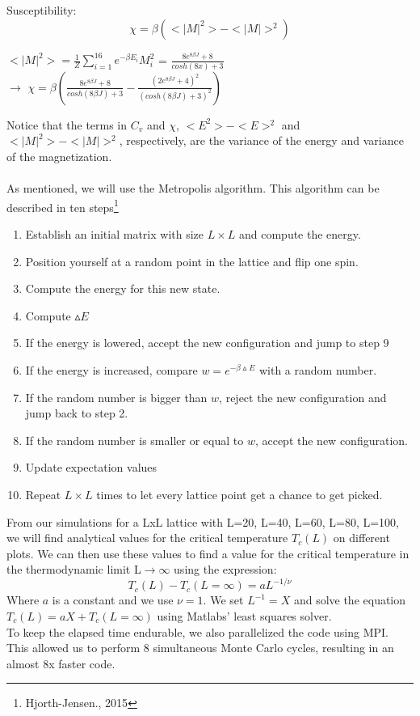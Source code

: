 \documentclass[10pt,a4paper]{article}
\begin{document}
Susceptibility:
$$\chi=\beta(<|M|^2>-<|M|>^2)$$
\begin{center}
$<|M|^2>=\frac{1}{Z}\sum\limits_{i=1}^{16}e^{-\beta E_i}M_i^2$ = $\frac{8e^{8\beta J}+8}{cosh(8x)+3}$\\
$\rightarrow$
$\chi = \beta(\frac{8e^{8\beta J}+8}{cosh(8\beta J)+3}-\frac{(2e^{8\beta J}+4)^2}{(cosh(8\beta J)+3)^2})$\\
\end{center}
\noindent Notice that the terms in $C_v$ and $\chi$, $<E^2>-<E>^2$ and $<|M|^2>-<|M|>^2$, respectively, are the variance of the energy and variance of the magnetization.\\
\\
As mentioned, we will use the Metropolis algorithm. This algorithm can be described in ten steps\footnote{Hjorth-Jensen., 2015}\begin{enumerate}
\item Establish an initial matrix with size $L \times L$ and compute the energy.
\item Position yourself at a random point in the lattice and flip one spin.
\item Compute the energy for this new state.
\item Compute $\vartriangle E$ 
\item If the energy is lowered, accept the new configuration and jump to step 9
\item If the energy is increased, compare $w=e^{-\beta \vartriangle E}$ with a random number.
\item If the random number is bigger than $w$, reject the new configuration and jump back to step 2.
\item If the random number is smaller or equal to $w$, accept the new configuration. 
\item Update expectation values
\item Repeat $L \times L$ times to let every lattice point get a chance to get picked.\\
\end{enumerate}

\noindent From our simulations for a LxL lattice with L=20, L=40, L=60, L=80, L=100, we will find analytical values for the critical temperature $T_c(L)$ on different plots. We can then use these values to find a value for the critical temperature in the thermodynamic limit L$\rightarrow \infty$ using the expression: $$T_c(L)-T_c(L=\infty)=aL^{-1/\nu}$$
Where $a$ is a constant and we use $\nu=1$. We set $L^{-1}=X$ and solve the equation $T_c(L)=aX+T_c(L=\infty)$ using Matlabs' least squares solver.\\
\noindent To keep the elapsed time endurable, we also parallelized the code using MPI. This allowed us to perform 8 simultaneous Monte Carlo cycles, resulting in an almost 8x faster code.
\end{document}
